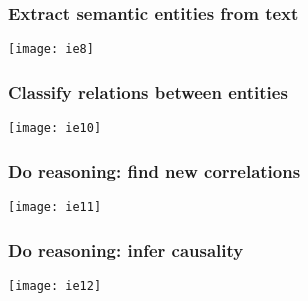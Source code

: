 \begin{frame}[fragile]
  \frametitle{Extract semantic entities from text}
\begin{center}
\texttt{[image: ie8]}
\end{center}
\end{frame}

\begin{frame}[fragile]
  \frametitle{Classify relations between entities}
\begin{center}
\texttt{[image: ie10]}
\end{center}
\end{frame}

\begin{frame}[fragile]
  \frametitle{Do reasoning: find new correlations}
\begin{center}
\texttt{[image: ie11]}
\end{center}
\end{frame}

\begin{frame}[fragile]
  \frametitle{Do reasoning: infer causality}
\begin{center}
\texttt{[image: ie12]}
\end{center}
\end{frame}



